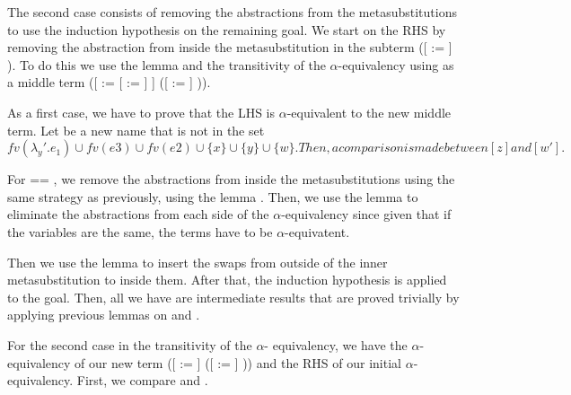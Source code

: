The second case consists of removing the abstractions from the metasubstitutions to use the induction hypothesis on the remaining goal. We start on the RHS by removing the abstraction from inside the metasubstitution in the subterm ([ := ]   ). To do this we use the lemma  and the transitivity of the $\alpha$-equivalency using as a middle term ([ := [ := ] ]   ([ := ]    )). 
\begin{coqdoccode}
\end{coqdoccode}
As a first case, we have to prove that the LHS is $\alpha$-equivalent to the new middle term. Let  be a new name that is not in the set $fv(\lambda_y'.e_1) \cup fv(e3) \cup fv(e2) \cup \{x\} \cup \{y\} \cup \{w\}. Then, a comparison is made between [z] and [w']. $ 
\begin{coqdoccode}
\end{coqdoccode}
For  == , we remove the abstractions from inside the metasubstitutions using the same strategy as previously, using the lemma . Then, we use the lemma  to eliminate the abstractions from each side of the $\alpha$-equivalency since given that if the variables are the same, the terms have to be $\alpha$-equivatent.
\begin{coqdoccode}
\end{coqdoccode}
Then we use the lemma  to insert the swaps from outside of the inner metasubstitution to inside them. After that, the induction hypothesis is applied to the goal. Then, all we have are intermediate results that are proved trivially by applying previous lemmas on  and . 
\begin{coqdoccode}
\end{coqdoccode}
For the second case in the transitivity of the $\alpha$- equivalency, we have the $\alpha$-equivalency of our new term ([ := ]   ([ := ]    )) and the RHS of our initial $\alpha$-equivalency. First, we compare  and . 
\begin{coqdoccode}
\end{coqdoccode}
